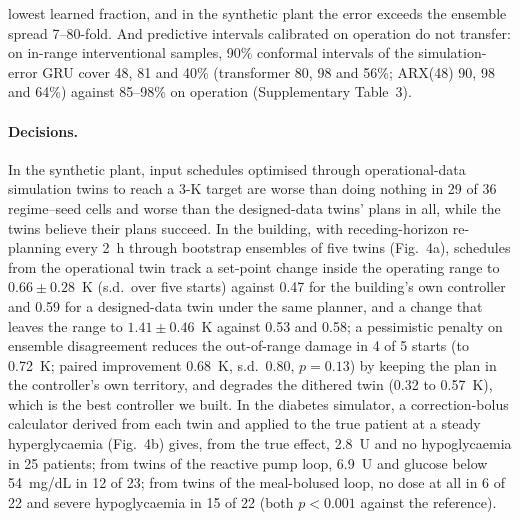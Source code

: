 \documentclass[11pt]{article}
\begin{document}
lowest learned fraction, and in the synthetic plant the error exceeds the ensemble spread 7--80-fold. And predictive intervals calibrated on operation do not transfer: on in-range interventional samples, 90\% conformal intervals of the simulation-error GRU cover 48, 81 and 40\% (transformer 80, 98 and 56\%; ARX(48) 90, 98 and 64\%) against 85--98\% on operation (Supplementary Table~3).

\paragraph{Decisions.} In the synthetic plant, input schedules optimised through operational-data simulation twins to reach a 3-K target are worse than doing nothing in 29 of 36 regime--seed cells and worse than the designed-data twins' plans in all, while the twins believe their plans succeed. In the building, with receding-horizon re-planning every 2~h through bootstrap ensembles of five twins (Fig.~4a), schedules from the operational twin track a set-point change inside the operating range to $0.66\pm0.28$~K (s.d.\ over five starts) against 0.47 for the building's own controller and 0.59 for a designed-data twin under the same planner, and a change that leaves the range to $1.41\pm0.46$~K against 0.53 and 0.58; a pessimistic penalty on ensemble disagreement \citep{yu2020mopo} reduces the out-of-range damage in 4 of 5 starts (to 0.72~K; paired improvement 0.68~K, s.d.\ 0.80, $p=0.13$) by keeping the plan in the controller's own territory, and degrades the dithered twin (0.32 to 0.57~K), which is the best controller we built. In the diabetes simulator, a correction-bolus calculator derived from each twin and applied to the true patient at a steady hyperglycaemia (Fig.~4b) gives, from the true effect, 2.8~U and no hypoglycaemia in 25 patients; from twins of the reactive pump loop, 6.9~U and glucose below 54~mg/dL in 12 of 23; from twins of the meal-bolused loop, no dose at all in 6 of 22 and severe hypoglycaemia in 15 of 22 (both $p<0.001$ against the reference).
\end{document}
